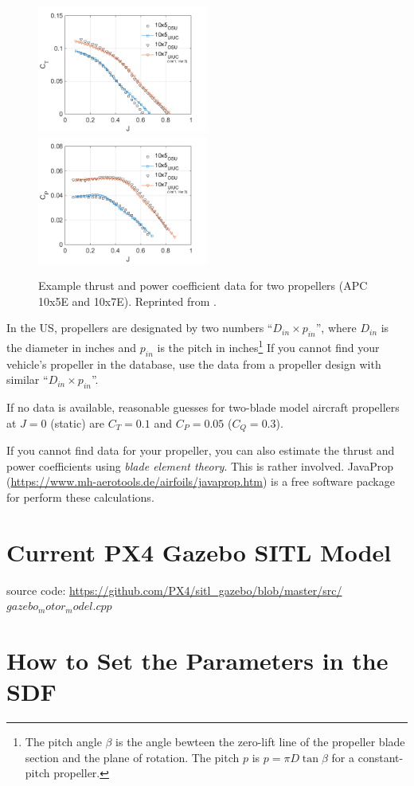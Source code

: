 \documentclass[12pt]{article}
\begin{document}
\begin{figure}
    \includegraphics[width=0.5\textwidth]{UIUC-OSU-APC-E-comparison-June-2015-CT.png}
    \includegraphics[width=0.5\textwidth]{UIUC-OSU-APC-E-comparison-June-2015-CP.png}
    \caption{\label{fig:prop_data_example} Example thrust and power coefficient data for two propellers (APC 10x5E and 10x7E). Reprinted from \cite{UIUCdatabase}.}
\end{figure}

In the US, propellers are designated by two numbers ``$D_{in} \times p_{in}$'', where $D_{in}$ is the diameter in inches and $p_{in}$ is the pitch in inches\footnote{The pitch angle $\beta$ is the angle bewteen the zero-lift line of the propeller blade section and the plane of rotation. The pitch $p$ is $p = \pi D \tan \beta$ for a constant-pitch propeller.} If you cannot find your vehicle's propeller in the database, use the data from a propeller design with similar ``$D_{in} \times p_{in}$''.

If no data is available, reasonable guesses for two-blade model aircraft propellers at $J=0$ (static) are $C_T = 0.1$ and $C_P = 0.05$ ($C_Q = 0.3$).

If you cannot find data for your propeller, you can also estimate the thrust and power coefficients using \emph{blade element theory}. This is rather involved. JavaProp (\url{https://www.mh-aerotools.de/airfoils/javaprop.htm}) is a free software package for perform these calculations.


\section{Current PX4 Gazebo SITL Model}

source code: \url{https://github.com/PX4/sitl_gazebo/blob/master/src/}
$gazebo_motor_model.cpp$


\section{How to Set the Parameters in the SDF}




\printbibliography
\end{document}
